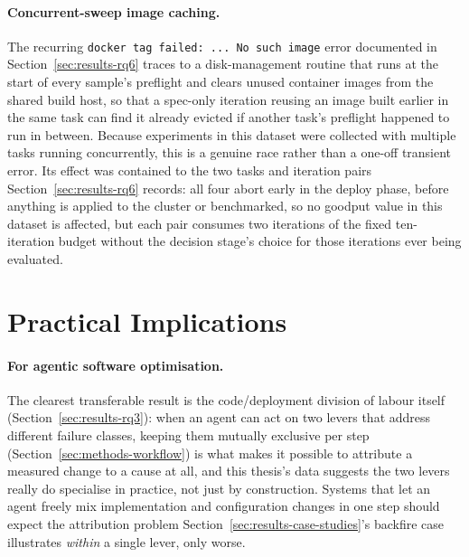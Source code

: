 \paragraph{Concurrent-sweep image caching.} The recurring
\texttt{docker tag failed: ... No such image} error documented in
Section~\ref{sec:results-rq6} traces to a disk-management routine that runs
at the start of every sample's preflight and clears unused container
images from the shared build host, so that a spec-only iteration reusing
an image built earlier in the same task can find it already evicted if
another task's preflight happened to run in between. Because experiments
in this dataset were collected with multiple tasks running concurrently,
this is a genuine race rather than a one-off transient error. Its effect
was contained to the two tasks and iteration pairs Section~\ref{sec:results-rq6}
records: all four abort early in the deploy phase, before anything is
applied to the cluster or benchmarked, so no goodput
value in this dataset is affected, but each pair consumes two iterations
of the fixed ten-iteration budget without the decision stage's choice for
those iterations ever being evaluated.


\section{Practical Implications}
\label{sec:discussion-implications}

\paragraph{For agentic software optimisation.} The clearest transferable
result is the code/deployment division of labour itself
(Section~\ref{sec:results-rq3}): when an agent can act on two levers that
address different failure classes, keeping them mutually exclusive per
step (Section~\ref{sec:methods-workflow}) is what makes it possible to
attribute a measured change to a cause at all, and this thesis's data
suggests the two levers really do specialise in practice, not just by
construction. Systems that let an agent freely mix implementation and
configuration changes in one step should expect the attribution problem
Section~\ref{sec:results-case-studies}'s backfire case illustrates \emph{within} a
single lever, only worse.


